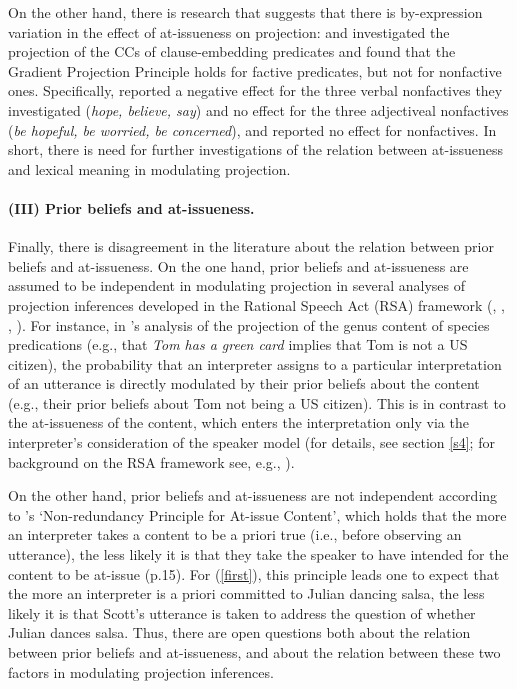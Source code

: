 \documentclass[11pt,fleqn]{article}
\newcommand{\6}{\mbox{$[\hspace*{-.6mm}[$}}
\newcommand{\9}{\mbox{$]\hspace*{-.6mm}]$}}
\newcommand{\citepos}[1]{\citeauthor{#1}'s \citeyear{#1}}
\begin{document}
On the other hand, there is research that suggests that there is by-expression variation in the effect of at-issueness on projection: \cite*{djaerv-bacovcin-salt27, djaerv-bacovcin2020} and \citet{mahler-etal2020} investigated the projection of the CCs of clause-embedding predicates and found that the Gradient Projection Principle holds for factive predicates, but not for nonfactive ones. Specifically, \citet{djaerv-bacovcin2020} reported a negative effect for the three verbal nonfactives they investigated ({\em hope, believe, say}) and no effect for the three adjectiveal nonfactives ({\em be hopeful, be worried, be concerned}), and \citet{mahler-etal2020} reported no effect for nonfactives. In short, there is need for further investigations of the relation between at-issueness and lexical meaning in modulating projection.

\paragraph{(III) Prior beliefs and at-issueness.} Finally, there is disagreement in the literature about the relation between prior beliefs and at-issueness. On the one hand, prior beliefs and at-issueness are assumed to be independent in modulating projection in several analyses of projection inferences developed in the Rational Speech Act (RSA) framework (\citealt*{qing-etal2016}, \citealt*{stevens-etal2017}, \citealt{warstadt2022}, \citealt{pan-degen2023}). For instance, in \citepos{warstadt2022} analysis of the projection of the genus content of species predications (e.g., that {\em Tom has a green card} implies that Tom is not a US citizen), the probability that an interpreter assigns to a particular interpretation of an utterance is directly modulated by their prior beliefs about the content (e.g., their prior beliefs about Tom not being a US citizen). This is in contrast to the at-issueness of the content, which enters the interpretation only via the interpreter's consideration of the speaker model (for details, see section \ref{s4}; for background on the RSA framework see, e.g., \citealt{degen2023-RSA}). 

On the other hand, prior beliefs and at-issueness are not independent according to \citepos{tonhauser-etal-eval} `Non-redundancy Principle for At-issue Content', which holds that the more an interpreter takes a content to be a priori true (i.e., before observing an utterance), the less likely it is that they take the speaker to have intended for the content to be at-issue (p.15).  For (\ref{first}), this principle leads one to expect that the more an interpreter is a priori committed to Julian dancing salsa, the less likely it is that Scott's utterance is taken to address the question of whether Julian dances salsa.  Thus, there are open questions both about the relation between prior beliefs and at-issueness, and about the relation between these two factors in modulating projection inferences.
\end{document}

